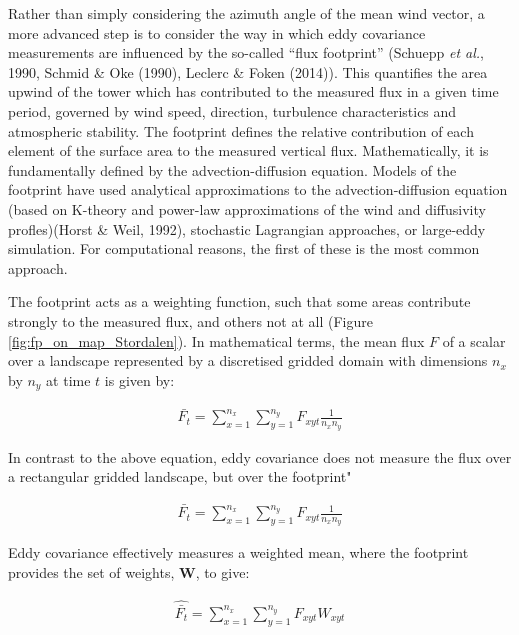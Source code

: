 Rather than simply considering the azimuth angle of the mean wind
vector, a more advanced step is to consider the way in which eddy
covariance measurements are influenced by the so-called ``flux
footprint'' (Schuepp \emph{et al.}, 1990, Schmid \& Oke (1990), Leclerc
\& Foken (2014)). This quantifies the area upwind of the tower which has
contributed to the measured flux in a given time period, governed by
wind speed, direction, turbulence characteristics and atmospheric
stability. The footprint defines the relative contribution of each
element of the surface area to the measured vertical flux.
Mathematically, it is fundamentally defined by the advection-diffusion
equation. Models of the footprint have used analytical approximations to
the advection-diffusion equation (based on K-theory and power-law
approximations of the wind and diffusivity profles)(Horst \& Weil,
1992), stochastic Lagrangian approaches, or large-eddy simulation. For
computational reasons, the first of these is the most common approach.

The footprint acts as a weighting function, such that some areas
contribute strongly to the measured flux, and others not at all (Figure
\ref{fig:fp_on_map_Stordalen}). In mathematical terms, the mean flux
\(F\) of a scalar over a landscape represented by a discretised gridded
domain with dimensions \(n_x\) by \(n_y\) at time \(t\) is given by:

\begin{align}   \label{eq:simpleMean}
  \bar{F_t} = \sum_{x = 1}^{n_x} \sum_{y = 1}^{n_y} F_{xyt} \frac{1}{n_x n_y}
\end{align}

In contrast to the above equation, eddy covariance does not measure the flux over a rectangular gridded landscape, but over the footprint"

\begin{align}   \label{eq:simpleMean}
  \bar{F_t} = \sum_{x = 1}^{n_x} \sum_{y = 1}^{n_y} F_{xyt} \frac{1}{n_x n_y}
\end{align}



Eddy covariance effectively measures a weighted mean, where the
footprint provides the set of weights, \(\mathbf{W}\), to give:

\begin{align}   \label{eq:weightMean}
  \widehat{\bar{F_t}} = \sum_{x = 1}^{n_x} \sum_{y = 1}^{n_y} F_{xyt} W_{xyt}
\end{align}

